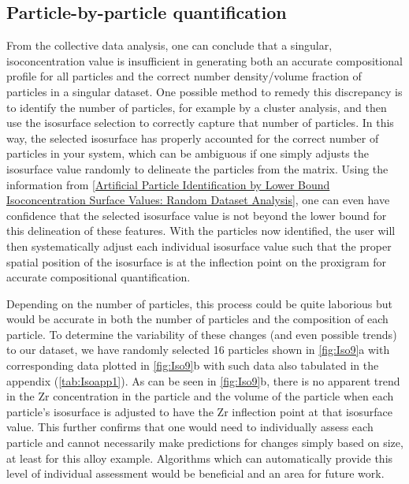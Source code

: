 	\subsection*{Particle-by-particle quantification} 

		From the collective data analysis, one can conclude that a singular, isoconcentration value is insufficient in generating both an accurate compositional profile for all particles and the correct number density/volume fraction of particles in a singular dataset. One possible method to remedy this discrepancy is to identify the number of particles, for example by a cluster analysis, and then use the isosurface selection to correctly capture that number of particles. In this way, the selected isosurface has properly accounted for the correct number of particles in your system, which can be ambiguous if one simply adjusts the isosurface value randomly to delineate the particles from the matrix. Using the information from \ref{Artificial Particle Identification by Lower Bound Isoconcentration Surface Values: Random Dataset Analysis}, one can even have confidence that the selected isosurface value is not beyond the lower bound for this delineation of these features. With the particles now identified, the user will then systematically adjust each individual isosurface value such that the proper spatial position of the isosurface is at the inflection point on the proxigram for accurate compositional quantification. 
		
		Depending on the number of particles, this process could be quite laborious but would be accurate in both the number of particles and the composition of each particle. To determine the variability of these changes (and even possible trends) to our dataset, we have randomly selected 16 particles shown in \ref{fig:Iso9}a with corresponding data plotted in \ref{fig:Iso9}b with such data also tabulated in the appendix (\ref{tab:Isoapp1}). As can be seen in \ref{fig:Iso9}b, there is no apparent trend in the Zr concentration in the particle and the volume of the particle when each particle’s isosurface is adjusted to have the Zr inflection point at that isosurface value. This further confirms that one would need to individually assess each particle and cannot necessarily make predictions for changes simply based on size, at least for this alloy example. Algorithms which can automatically provide this level of individual assessment would be beneficial and an area for future work. 
		
